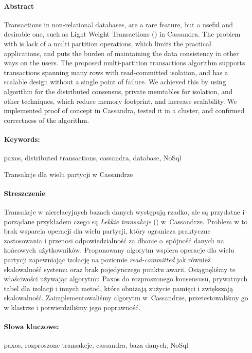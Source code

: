 \newpage
\paragraph{Abstract} 
Transactions in non-relational databases, are a rare feature, but a useful and desirable one, such as Light Weight Transactions (\lwt) in Cassandra.
The problem with \lwt is lack of a multi partition operations, which limits the practical applications, and puts the burden of maintaining the data consistency in other ways on the users.
The proposed multi-partition transactions algorithm supports transactions spanning many rows with read-committed isolation, and has a scalable design without a single point of failure.
We achieved this by using \paxos algorithm for the distributed consensus, private memtables for isolation, and other techniques, which reduce memory footprint, and increase scalability.
We implemented proof of concept in Cassandra, tested it in a cluster, and confirmed correctness of the algorithm.

\paragraph{Keywords:} paxos, distributed transactions, cassandra, database, NoSql

\begin{center}
    \fontsize{12pt}{14pt}\selectfont
      Transakcje dla wielu partycji w Cassandrze  \\
\end{center}
\paragraph{Streszczenie} 
Transakcje w nierelacyjnych bazach danych występują rzadko, ale są przydatne i porządane przykładem czego są \emph{Lekkie transakcje} (\lwt) \mbox{w Cassandrze.}
Problem w \lwt to brak wsparcia operacji dla wielu partycji, który ogranicza praktyczne zastosowania i przenosi odpowiedzialność za dbanie \mbox{o spójność} danych na końcowych użytkowników.
Proponowany algorytm wspiera operacje dla wielu partycji zapewniając izolację na poziomie \emph{read-committed} jak również skalowalność systemu oraz brak pojedynczego punktu awarii.
Osiągnęliśmy te właściwości używając algorytmu Paxos do rozproszonego konsensusu, prywatnych tabel dla izolacji i innych metod, które obniżają zużycie pamięci i zwiększają skalowalność.
Zaimplementowaliśmy algorytm \mbox{w Cassandrze}, przetestowaliśmy go w klastrze i potwierdziliśmy jego poprawność.

\paragraph{Słowa kluczowe:} paxos, rozproszone transakcje, cassandra, baza danych, NoSql


